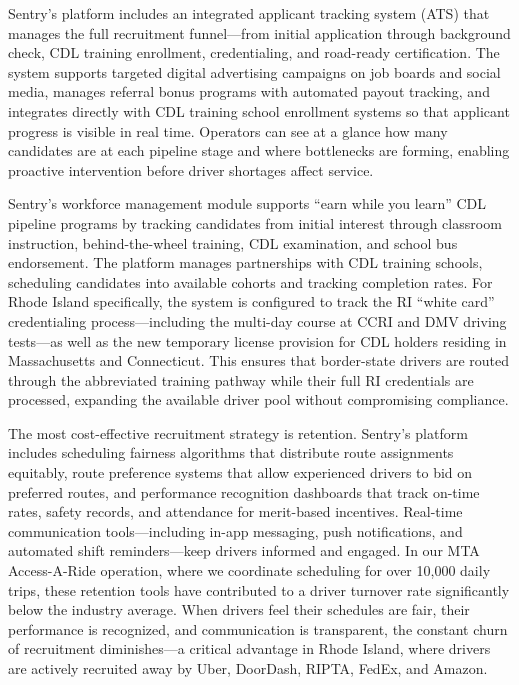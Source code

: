 \begin{description}[style=nextline, leftmargin=0.5cm]
    \item[\faIcon{bullhorn} \textbf{Recruitment Technology:}] Sentry's platform includes an integrated applicant tracking system (ATS) that manages the full recruitment funnel---from initial application through background check, CDL training enrollment, credentialing, and road-ready certification. The system supports targeted digital advertising campaigns on job boards and social media, manages referral bonus programs with automated payout tracking, and integrates directly with CDL training school enrollment systems so that applicant progress is visible in real time. Operators can see at a glance how many candidates are at each pipeline stage and where bottlenecks are forming, enabling proactive intervention before driver shortages affect service.

    \item[\faIcon{graduation-cap} \textbf{CDL Pipeline Development:}] Sentry's workforce management module supports ``earn while you learn'' CDL pipeline programs by tracking candidates from initial interest through classroom instruction, behind-the-wheel training, CDL examination, and school bus endorsement. The platform manages partnerships with CDL training schools, scheduling candidates into available cohorts and tracking completion rates. For Rhode Island specifically, the system is configured to track the RI ``white card'' credentialing process---including the multi-day course at CCRI and DMV driving tests---as well as the new temporary license provision for CDL holders residing in Massachusetts and Connecticut. This ensures that border-state drivers are routed through the abbreviated training pathway while their full RI credentials are processed, expanding the available driver pool without compromising compliance.

    \item[\faIcon{handshake} \textbf{Retention as Recruitment:}] The most cost-effective recruitment strategy is retention. Sentry's platform includes scheduling fairness algorithms that distribute route assignments equitably, route preference systems that allow experienced drivers to bid on preferred routes, and performance recognition dashboards that track on-time rates, safety records, and attendance for merit-based incentives. Real-time communication tools---including in-app messaging, push notifications, and automated shift reminders---keep drivers informed and engaged. In our MTA Access-A-Ride operation, where we coordinate scheduling for over 10,000 daily trips, these retention tools have contributed to a driver turnover rate significantly below the industry average. When drivers feel their schedules are fair, their performance is recognized, and communication is transparent, the constant churn of recruitment diminishes---a critical advantage in Rhode Island, where drivers are actively recruited away by Uber, DoorDash, RIPTA, FedEx, and Amazon.
\end{description}


